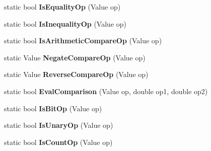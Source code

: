 \begin{DoxyCompactItemize}
\item 
static bool {\bfseries Is\+Equality\+Op} (Value op)\hypertarget{classv8_1_1internal_1_1_token_ad7ff5a7e1c7fcce3f0e0543699f4b516}{}\label{classv8_1_1internal_1_1_token_ad7ff5a7e1c7fcce3f0e0543699f4b516}

\item 
static bool {\bfseries Is\+Inequality\+Op} (Value op)\hypertarget{classv8_1_1internal_1_1_token_a116d1bf935776539ad65bc7a8c6104e1}{}\label{classv8_1_1internal_1_1_token_a116d1bf935776539ad65bc7a8c6104e1}

\item 
static bool {\bfseries Is\+Arithmetic\+Compare\+Op} (Value op)\hypertarget{classv8_1_1internal_1_1_token_aed56f3d95c5f9029660176c492e25480}{}\label{classv8_1_1internal_1_1_token_aed56f3d95c5f9029660176c492e25480}

\item 
static Value {\bfseries Negate\+Compare\+Op} (Value op)\hypertarget{classv8_1_1internal_1_1_token_abc75b08db16d9fba30c6de0f0f376c7f}{}\label{classv8_1_1internal_1_1_token_abc75b08db16d9fba30c6de0f0f376c7f}

\item 
static Value {\bfseries Reverse\+Compare\+Op} (Value op)\hypertarget{classv8_1_1internal_1_1_token_aefbc3f71efb485c195118fdfea3e1684}{}\label{classv8_1_1internal_1_1_token_aefbc3f71efb485c195118fdfea3e1684}

\item 
static bool {\bfseries Eval\+Comparison} (Value op, double op1, double op2)\hypertarget{classv8_1_1internal_1_1_token_a9315bb6ad71b493ad6592621fb955104}{}\label{classv8_1_1internal_1_1_token_a9315bb6ad71b493ad6592621fb955104}

\item 
static bool {\bfseries Is\+Bit\+Op} (Value op)\hypertarget{classv8_1_1internal_1_1_token_a95c7a019410d240107ca5d5dfecb696d}{}\label{classv8_1_1internal_1_1_token_a95c7a019410d240107ca5d5dfecb696d}

\item 
static bool {\bfseries Is\+Unary\+Op} (Value op)\hypertarget{classv8_1_1internal_1_1_token_a835fae2434bcf697c5100399ba6c662f}{}\label{classv8_1_1internal_1_1_token_a835fae2434bcf697c5100399ba6c662f}

\item 
static bool {\bfseries Is\+Count\+Op} (Value op)\hypertarget{classv8_1_1internal_1_1_token_ab9a0e734a80e1d0101a0954891af333d}{}\label{classv8_1_1internal_1_1_token_ab9a0e734a80e1d0101a0954891af333d}


\end{DoxyCompactItemize}
